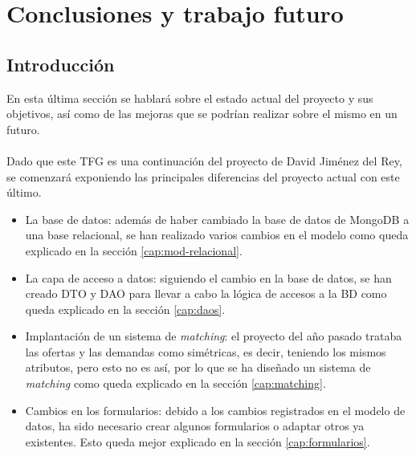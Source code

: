 \documentclass[11pt]{book}
\begin{document}
	\chapter{Conclusiones y trabajo futuro}
	\section{Introducción}
	En esta última sección se hablará sobre el estado actual del proyecto y sus objetivos, así como de las mejoras que se podrían realizar sobre el mismo en un futuro.\\\\
	
	Dado que este TFG es una continuación del proyecto de David Jiménez del Rey, se comenzará exponiendo las principales diferencias del proyecto actual con este último.
	\begin{itemize}
		\item La base de datos: además de haber cambiado la base de datos de MongoDB a una base relacional, se han realizado varios cambios en el modelo 		como queda explicado en la sección \ref{cap:mod-relacional}.
		\item La capa de acceso a datos: siguiendo el cambio en la base de datos, se han creado DTO y DAO para llevar a cabo la lógica de accesos a la BD 			como queda explicado en la sección \ref{cap:daos}.
		\item Implantación de un sistema de \emph{matching}: el proyecto del año pasado trataba las ofertas y las demandas como simétricas, es decir, teniendo los mismos atributos, pero esto no 	es así, por lo que se ha diseñado un sistema de\emph{ matching} como queda explicado en la sección \ref{cap:matching}.
		\item Cambios en los formularios: debido a los cambios registrados en el modelo de datos, ha sido necesario crear algunos formularios o adaptar otros ya existentes. Esto queda mejor explicado en la sección \ref{cap:formularios}.
	\end{itemize}
	
\end{document}
